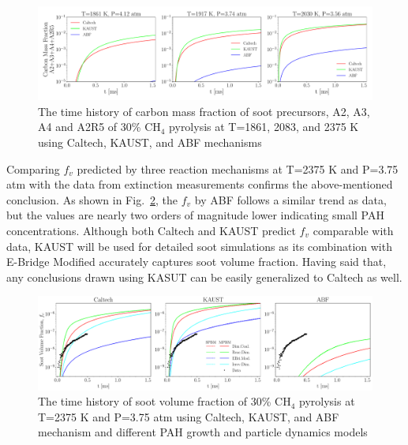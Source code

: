 \begin{figure}[H]
	\centering
	\includegraphics[width=1\textwidth]{Figures/Results/Shocktube/Stanford/june/30CH4_SPC_mechs_nosoot_subset.pdf}
	\caption{The time history of carbon mass fraction of soot precursors, A2, A3, A4 and A2R5 of 30\% $\mathrm{CH_4}$ pyrolysis at T=1861, 2083, and 2375 K using Caltech, KAUST, and ABF mechanisms}
	\label{fig:shocktubest_30ch4_spc_nosoot_subset} 
\end{figure}

Comparing $f_v$ predicted by three reaction mechanisms at T=2375 K and P=3.75 atm with the data from extinction measurements confirms the above-mentioned conclusion. As shown in Fig.~\ref{fig:shocktubest_30ch4_sootvf_single}, the $f_v$ by ABF follows a similar trend as data, but the values are nearly two orders of magnitude lower indicating small PAH concentrations. Although both Caltech and KAUST predict $f_v$ comparable with data, KAUST will be used for detailed soot simulations as its combination with E-Bridge Modified accurately captures soot volume fraction. Having said that, any conclusions drawn using KASUT can be easily generalized to Caltech as well.


\begin{figure}[H]
	\centering
	\includegraphics[width=1\textwidth]{Figures/Results/Shocktube/Stanford/june/30CH4_sootvf_mechs_single.pdf}
	\caption{The time history of soot volume fraction of 30\% $\mathrm{CH_4}$ pyrolysis at T=2375 K and P=3.75 atm using Caltech, KAUST, and ABF mechanism and different PAH growth and particle dynamics models}
	\label{fig:shocktubest_30ch4_sootvf_single} 
\end{figure}

